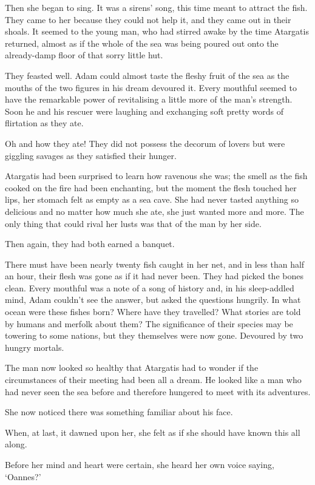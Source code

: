 Then she began to sing. It was a sirens’ song, this time meant to
attract the fish. They came to her because they could not help it, and
they came out in their shoals. It seemed to the young man, who had
stirred awake by the time Atargatis returned, almost as if the whole
of the sea was being poured out onto the already-damp floor of that
sorry little hut.

They feasted well. Adam could almost taste the fleshy fruit of the sea
as the mouths of the two figures in his dream devoured it. Every
mouthful seemed to have the remarkable power of revitalising a little
more of the man’s strength. Soon he and his rescuer were laughing and
exchanging soft pretty words of flirtation as they ate.

Oh and how they ate! They did not possess the decorum of lovers but
were giggling savages as they satisfied their hunger.

Atargatis had been surprised to learn how ravenous she was; the smell
as the fish cooked on the fire had been enchanting, but the moment the
flesh touched her lips, her stomach felt as empty as a sea cave. She
had never tasted anything so delicious and no matter how much she ate,
she just wanted more and more. The only thing that could rival her
lusts was that of the man by her side.

Then again, they had both earned a banquet.

There must have been nearly twenty fish caught in her net, and in less
than half an hour, their flesh was gone as if it had never been. They
had picked the bones clean. Every mouthful was a note of a song of
history and, in his sleep-addled mind, Adam couldn’t see the answer,
but asked the questions hungrily. In what ocean were these fishes
born? Where have they travelled? What stories are told by humans and
merfolk about them? The significance of their species may be towering
to some nations, but they themselves were now gone. Devoured by two
hungry mortals.

The man now looked so healthy that Atargatis had to wonder if the
circumstances of their meeting had been all a dream. He looked like a
man who had never seen the sea before and therefore hungered to meet
with its adventures.

She now noticed there was something familiar about his face.

When, at last, it dawned upon her, she felt as if she should have
known this all along.

Before her mind and heart were certain, she heard her own voice
saying, `Oannes?'


